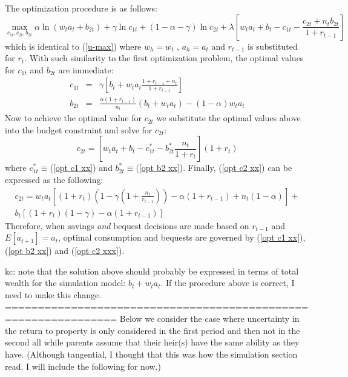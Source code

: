 \documentclass{article}
\begin{document}
The optimization procedure is as follows:
\begin{equation}
\max_{c_{1t}, c_{2t}, b_{2t}}
\alpha \ln (w_t a_t+ b_{2t})
+ \gamma \ln c_{1t}
+ (1-\alpha-\gamma) \ln c_{2t}
+ \lambda [w_t a_t + b_t - c_{1t} - \frac{c_{2t} + n_t b_{2t}}{1+r_{t-1}}]
\end{equation}
which is identical to (\ref{u-max}) where $w_h = w_t$ , $a_h = a_t$ and  $r_{t-1}$ is substituted for $r_t$.  With such similarity to the first optimization problem, the optimal values for $c_{1t}$ and $b_{2t}$ are immediate:
\begin{eqnarray}
c_{1t} &=& \gamma[b_t + w_t a_t \frac{1+r_{t-1} +n_t} {1+r_{t-1}}]\label{opt c1 xx}\\
b_{2t} &=& \frac{\alpha(1+r_{t-1})}{n_t}(b_t+w_t a_t)-(1-\alpha)w_t a_t \label{opt b2 xx}
\end{eqnarray}\newline
Now to achieve the optimal value for $c_{2t}$ we substitute the optimal values above into the budget constraint and solve for $c_{2t}$:
\begin{equation}\label{opt c2 xx}
c_{2t} = [w_t a_t + b_t - c^{*}_{1t} - b^{*}_{2t}\frac{n_t}{1+r_{t}}](1+r_{t})
\end{equation}
where $c^{*}_{1t}\equiv$(\ref{opt c1 xx}) and $b^{*}_{2t} \equiv$(\ref{opt b2 xx}).  Finally, (\ref{opt c2 xx}) can be expressed as the following:
\begin{equation}\label{opt c2 xxx}
\begin{split}
c_{2t} = w_t a_t [(1+r_t)(1-\gamma(1+\frac{n_t}{r_{t-1}})) - \alpha(1+r_{t-1}) + n_t(1-\alpha)] + \\
b_t[(1+r_t)(1-\gamma)-\alpha(1+r_{t-1})]
\end{split}
\end{equation}
Therefore, when savings \emph{and} bequest decisions are made based on $r_{t-1}$ and $E[a_{t+1}] = a_t$, optimal consumption and bequests are governed by (\ref{opt c1 xx}),(\ref{opt b2 xx}) and (\ref{opt c2 xxx}).\newline

kc: note that the solution above should probably be expressed in terms of total wealth for the simulation model: $b_t+w_t a_t$.  If the procedure above is correct, I need to make this change.\newline
===============================================================
Below we consider the case where uncertainty in the return to property is only considered in the first period and then not in the second all while parents assume that their heir(s) have the same ability as they have. (Although tangential, I thought that this was how the simulation section read.  I will include the following for now.)
\end{document}
